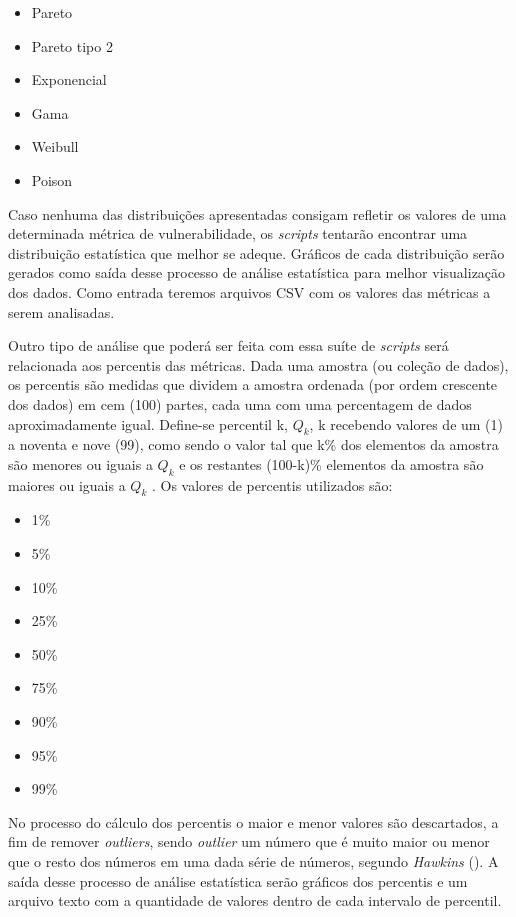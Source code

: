 \begin{itemize}
  \item Pareto
  \item Pareto tipo 2
  \item Exponencial
  \item Gama
  \item Weibull
  \item Poison
\end{itemize}

Caso nenhuma das distribuições apresentadas consigam refletir os valores de uma determinada métrica de vulnerabilidade, os
\textit{scripts} tentarão encontrar uma distribuição estatística que melhor se adeque. Gráficos de cada distribuição serão
gerados como saída desse processo de análise estatística para melhor visualização dos dados. Como entrada teremos arquivos
CSV com os valores das métricas a serem analisadas.

Outro tipo de análise que poderá ser feita com essa suíte de \textit{scripts} será relacionada aos percentis das métricas.
Dada uma amostra (ou coleção de dados), os percentis são medidas que dividem a amostra ordenada (por ordem crescente dos dados) 
em cem (100) partes, cada uma com uma percentagem de dados aproximadamente igual. Define-se percentil k, ${Q_k}$, 
k recebendo valores de um (1) a noventa e nove (99), como sendo o valor tal que k\% dos elementos da amostra são menores ou 
iguais a ${Q_k}$ e os restantes (100-k)\% elementos da amostra são maiores ou iguais a ${Q_k}$ \cite{martins2013}. Os valores
de percentis utilizados são: 

\begin{multicols}{3}
  \begin{itemize}
    \item 1\%
    \item 5\%
    \item 10\%
    \item 25\%
    \item 50\%
    \item 75\%
    \item 90\%
    \item 95\%
    \item 99\%
  \end{itemize}
\end{multicols}

No processo do cálculo dos percentis o maior e menor valores são descartados, a
fim de remover \textit{outliers}, sendo \textit{outlier} um número que é muito maior 
ou menor que o resto dos números em uma dada série de números, segundo \emph{Hawkins}
(\citeyear{hawkins80}). A saída desse processo de análise estatística serão gráficos 
dos percentis e um arquivo texto com a quantidade de valores dentro de cada intervalo 
de percentil.

